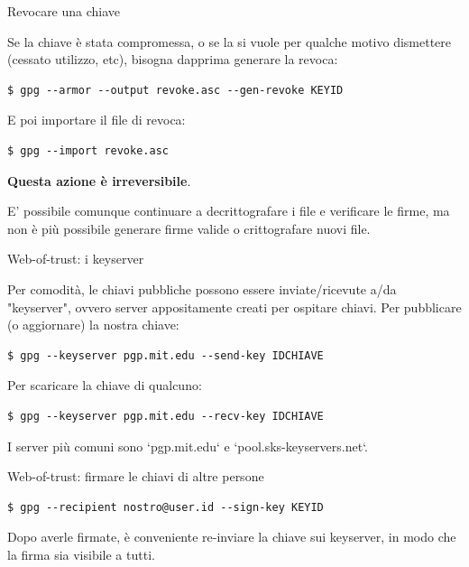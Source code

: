 \documentclass[10pt]{beamer}
\begin{document}
\begin{frame}[fragile]{Revocare una chiave}

Se la chiave è stata compromessa, o se la si vuole per qualche motivo dismettere (cessato utilizzo, etc), bisogna dapprima generare la revoca:

\begin{verbatim}
$ gpg --armor --output revoke.asc --gen-revoke KEYID
\end{verbatim}

E poi importare il file di revoca:

\begin{verbatim}
$ gpg --import revoke.asc
\end{verbatim}

\textbf{Questa azione è irreversibile}.

E' possibile comunque continuare a decrittografare i file e verificare le firme, ma non è più possibile generare firme valide o crittografare nuovi file.

\end{frame}

\begin{frame}[fragile]{Web-of-trust: i keyserver}

Per comodità, le chiavi pubbliche possono essere inviate/ricevute a/da "keyserver", ovvero server appositamente creati per ospitare chiavi. Per pubblicare (o aggiornare) la nostra chiave:

\begin{verbatim}
$ gpg --keyserver pgp.mit.edu --send-key IDCHIAVE
\end{verbatim}

Per scaricare la chiave di qualcuno:

\begin{verbatim}
$ gpg --keyserver pgp.mit.edu --recv-key IDCHIAVE
\end{verbatim}

I server più comuni sono `pgp.mit.edu` e `pool.sks-keyservers.net`.

\end{frame}

\begin{frame}[fragile]{Web-of-trust: firmare le chiavi di altre persone}

\begin{verbatim}
$ gpg --recipient nostro@user.id --sign-key KEYID
\end{verbatim}

Dopo averle firmate, è conveniente re-inviare la chiave sui keyserver, in modo che la firma sia visibile a tutti.

\end{frame}
\end{document}
